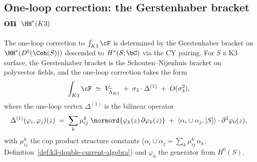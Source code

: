\subsection{One-loop correction: the Gerstenhaber bracket on $\HH^*(K3)$}
\label{subsec:k3-fact-one-loop}

\begin{conjecture}
\label{conj:k3-fact-one-loop}
\ClaimStatusConjectured
The one-loop correction to $\int_{K3} \cF$ is determined by the
Gerstenhaber bracket on $\HH^*(D^b(\Coh(S)))$ descended to
$H^*(S, \bC)$ via the CY pairing. For $S$ a K3 surface, the
Gerstenhaber bracket is the Schouten--Nijenhuis bracket on
polyvector fields, and the one-loop correction takes the form
\begin{equation}\label{eq:k3-fact-one-loop}
  \int_{K3} \cF
  \;\simeq\;
  V_{\widetilde{\Lambda}_{K3}}
  \;+\;
  \sigma_3 \cdot \Delta^{(1)}
  \;+\;
  O(\sigma_3^2),
\end{equation}
where the one-loop vertex $\Delta^{(1)}$ is the bilinear operator
\begin{equation}\label{eq:one-loop-vertex}
  \Delta^{(1)}(\varphi_i, \varphi_j)(z)
  \;=\;
  \sum_{k} \mu^k_{ij}\;
  \normord{\varphi_k(z)\, \partial\varphi_k(z)}
  \;+\;
  \langle \alpha_i \cup \alpha_j, [S] \rangle
  \cdot \partial^2 \varphi_0(z),
\end{equation}
with $\mu^k_{ij}$ the cup product structure constants
($\alpha_i \cup \alpha_j = \sum_k \mu^k_{ij}\, \alpha_k$,
Definition~\textup{\ref{def:k3-double-current-algebra}})
and $\varphi_0$ the generator from $H^0(S)$.
\end{conjecture}

